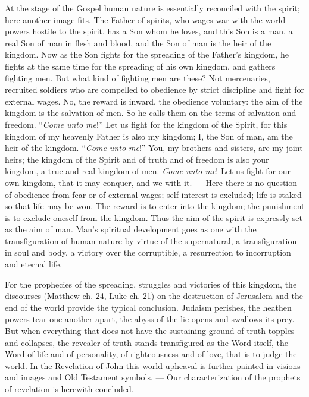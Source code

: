 \documentclass[12pt,a4paper,openany]{book}
\newcommand{\opage}[1]{\marginnote{\footnotesize\textit{[#1]}}}
\begin{document}
At the stage of the Gospel human nature is essentially
reconciled with the spirit; here another image fits.
The Father of spirits, who wages war with the world-powers
hostile to the spirit, has a Son whom he loves, and
this Son is a man, a real Son of man in
flesh and blood, and the Son of man is the heir of the kingdom.
Now as the Son fights for the spreading of the Father's
kingdom, he fights at the same time for the spreading of
his own kingdom, and gathers fighting men. But what kind of
fighting men are these? Not mercenaries, recruited soldiers
who are compelled to obedience by strict discipline and
fight for external wages. No, the reward is inward,
the obedience voluntary: the aim of the kingdom is the salvation of men.
So he calls them on the terms of salvation and freedom.
``\emph{Come unto me}!'' Let us fight for the kingdom of the Spirit,
for this kingdom of my heavenly Father is also
my kingdom; I, the Son of man, am the heir of the kingdom.
``\emph{Come unto me}!'' You, my brothers and sisters, are
my joint heirs; the kingdom of the Spirit and of truth and of freedom
is also your kingdom, a true and real
kingdom of men. \emph{Come unto me}! Let us fight
for our own kingdom, that it may conquer, and we with it. ---
Here there is no question of obedience from fear or of
\setcounter{footnote}{0}%
\opage{61}external wages; self-interest is excluded; life is staked
so that life may be won. The reward is to enter into
the kingdom; the punishment is to exclude oneself from the kingdom.
Thus the aim of the spirit is expressly set as the aim of man.
Man's spiritual development goes as one
with the transfiguration of human nature by virtue of the supernatural,
a transfiguration in soul and body, a victory
over the corruptible, a resurrection to incorruption
and eternal life.

For the prophecies of the spreading, struggles and victories
of this kingdom, the discourses (Matthew ch. 24,
Luke ch. 21) on the destruction of Jerusalem and the end of the world
provide the typical conclusion. Judaism perishes,
the heathen powers tear one another apart, the abyss of the lie
opens and swallows its prey. But when everything that
does not have the sustaining ground of truth topples and
collapses, the revealer of truth stands transfigured
as the Word itself, the Word of life and of personality, of righteousness
and of love, that is to judge
the world. In the Revelation of John this world-upheaval
is further painted in visions and images and
Old Testament symbols. --- Our characterization
of the prophets of revelation is herewith concluded.
\end{document}
